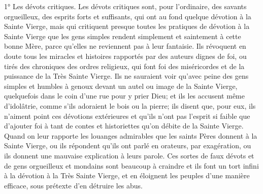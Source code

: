 1° Les dévots critiques.
 Les dévots critiques sont, pour l'ordinaire, des savants orgueilleux, des esprits forts et suffisants, qui ont au
fond quelque dévotion à la Sainte Vierge, mais qui critiquent presque toutes les pratiques de dévotion à la Sainte
Vierge que les gens simples rendent simplement et saintement à cette bonne Mère, parce qu'elles ne reviennent
pas à leur fantaisie. Ils révoquent en doute tous les miracles et histoires rapportés par des auteurs dignes de foi,
ou tirés des chroniques des ordres religieux, qui font foi des miséricordes et de la puissance de la Très Sainte
Vierge. Ils ne sauraient voir qu'avec peine des gens simples et humbles à genoux devant un autel ou image de la
Sainte Vierge, quelquefois dans le coin d'une rue pour y prier Dieu; et ils les accusent même d'idolâtrie, comme
s'ils adoraient le bois ou la pierre; ils disent que, pour eux, ils n'aiment point ces dévotions extérieures et qu'ils
n'ont pas l'esprit si faible que d'ajouter foi à tant de contes et historiettes qu'on débite de la Sainte Vierge. Quand
on leur rapporte les louanges admirables que les saints Pères donnent à la Sainte Vierge, ou ils répondent qu'ils
ont parlé en orateurs, par exagération, ou ils donnent une mauvaise explication à leurs parole.
Ces sortes de faux dévots et de gens orgueilleux et mondains sont beaucoup à craindre et ils font un tort infini à la
dévotion à la Très Sainte Vierge, et en éloignent les peuples d'une manière efficace, sous prétexte d'en détruire les
abus.

